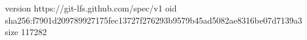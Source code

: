 version https://git-lfs.github.com/spec/v1
oid sha256:f7901d209789927175fec13727f276293b9579b45ad5082ae8316be07d7139a3
size 117282
